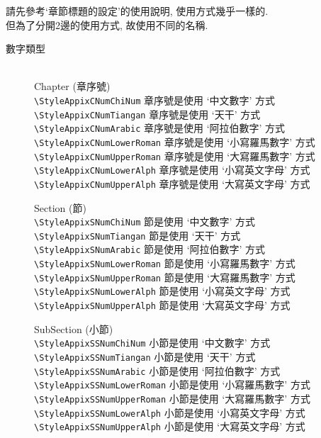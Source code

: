 \begin{enumerate}
{    請先參考`章節標題的設定'的使用說明, 使用方式幾乎一樣的.\\
    但為了分開2邊的使用方式, 故使用不同的名稱.

    \begin{description}

    \item [數字類型]\hfill\\
     Chapter (章序號)\\
        \verb|\StyleAppixCNumChiNum| 章序號是使用 `中文數字' 方式\\
        \verb|\StyleAppixCNumTiangan| 章序號是使用 `天干' 方式\\
        \verb|\StyleAppixCNumArabic| 章序號是使用 `阿拉伯數字' 方式\\
        \verb|\StyleAppixCNumLowerRoman| 章序號是使用 `小寫羅馬數字' 方式\\
        \verb|\StyleAppixCNumUpperRoman| 章序號是使用 `大寫羅馬數字' 方式\\
        \verb|\StyleAppixCNumLowerAlph| 章序號是使用 `小寫英文字母' 方式\\
        \verb|\StyleAppixCNumUpperAlph| 章序號是使用 `大寫英文字母' 方式

     Section (節)\\
        \verb|\StyleAppixSNumChiNum| 節是使用 `中文數字' 方式\\
        \verb|\StyleAppixSNumTiangan| 節是使用 `天干' 方式\\
        \verb|\StyleAppixSNumArabic| 節是使用 `阿拉伯數字' 方式\\
        \verb|\StyleAppixSNumLowerRoman| 節是使用 `小寫羅馬數字' 方式\\
        \verb|\StyleAppixSNumUpperRoman| 節是使用 `大寫羅馬數字' 方式\\
        \verb|\StyleAppixSNumLowerAlph| 節是使用 `小寫英文字母' 方式\\
        \verb|\StyleAppixSNumUpperAlph| 節是使用 `大寫英文字母' 方式

     SubSection (小節)\\
        \verb|\StyleAppixSSNumChiNum| 小節是使用 `中文數字' 方式\\
        \verb|\StyleAppixSSNumTiangan| 小節是使用 `天干' 方式\\
        \verb|\StyleAppixSSNumArabic| 小節是使用 `阿拉伯數字' 方式\\
        \verb|\StyleAppixSSNumLowerRoman| 小節是使用 `小寫羅馬數字' 方式\\
        \verb|\StyleAppixSSNumUpperRoman| 小節是使用 `大寫羅馬數字' 方式\\
        \verb|\StyleAppixSSNumLowerAlph| 小節是使用 `小寫英文字母' 方式\\
        \verb|\StyleAppixSSNumUpperAlph| 小節是使用 `大寫英文字母' 方式


\end{description}}
\end{enumerate}

